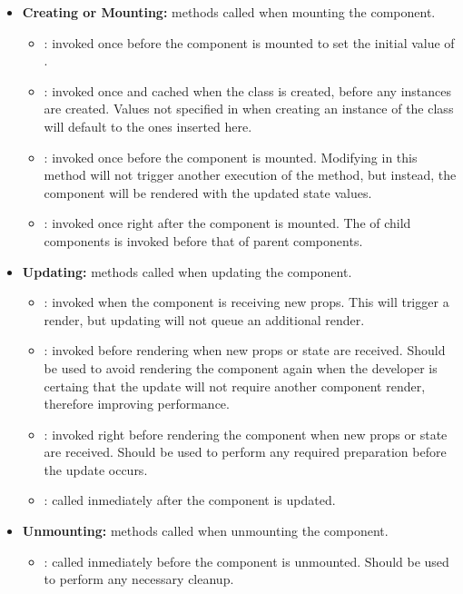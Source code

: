 \begin{itemize}
  \item \textbf{Creating or Mounting:} methods called when mounting the component.
  \begin{itemize}
      \item {}: invoked once before the component is mounted to set the initial value of .
      \item {}: invoked once and cached when the class is created, before any instances are created. Values not specified in  when creating an instance of the class will default to the ones inserted here.
      \item {}: invoked once before the component is mounted. Modifying  in this method will not trigger another execution of the  method, but instead, the component will be rendered with the updated state values.
      \item {}: invoked once right after the component is mounted. The  of child components is invoked before that of parent components.
    \end{itemize}
  \item \textbf{Updating:} methods called when updating the component.
    \begin{itemize}
      \item {}: invoked when the component is receiving new props. This will trigger a render, but updating  will not queue an additional render.
      \item {}: invoked before rendering when new props or state are received. Should be used to avoid rendering the component again when the developer is certaing that the update will not require another component render, therefore improving performance.
      \item {}: invoked right before rendering the component when new props or state are received. Should be used to perform any required preparation before the update occurs.
      \item {}: called inmediately after the component is updated.
    \end{itemize}
  \item \textbf{Unmounting:} methods called when unmounting the component.
    \begin{itemize}
      \item {}: called inmediately before the component is unmounted. Should be used to perform any necessary cleanup. 
    \end{itemize}
\end{itemize}

